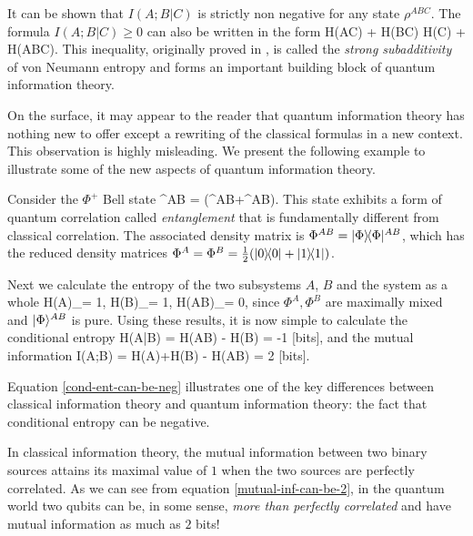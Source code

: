 \documentclass[aps,11pt,twoside,letterpaper]{article}
\theoremstyle{plain}
\theoremstyle{definition}
\begin{document}
			\noindent It can be shown that $I(A;B|C)$ is strictly non negative for any state $\rho^{ABC}$.
			The formula $I(A;B|C)\geq 0$ can also be written in the form
			\be	\label{strong-subadditivity}
				H(AC) + H(BC) 	\geq	H(C) + H(ABC).
			\ee
			This inequality, originally proved in \cite{LR73}, is called the \emph{strong subadditivity} of von Neumann 
			entropy and forms an important building block of quantum information theory.
			
			
			On the surface, it may appear to the reader that quantum information theory has nothing new to offer except 
			a rewriting of the classical formulas in a new context.
			This observation is highly misleading.
			We present the following example to illustrate some of the new aspects of quantum information theory.
			
			\begin{example}	\label{example:EPR-pair}
				Consider the $\Phi^{+}$\! Bell state 
				\be
					\ket{\Phi}^{AB} = (^{AB}+^{AB}).
				\ee
				This state exhibits a form of quantum correlation called \emph{entanglement} that is fundamentally
				different from classical correlation.
				The associated density matrix is $\Phi^{AB} = | \Phi \rangle\!\langle \Phi |^{AB}$, which has
				the reduced density matrices $\Phi^A = \Phi^B = \tfrac{1}{2}(| 0 \rangle\!\langle 0 | + | 1 \rangle\!\langle 1 |)$.
				
				Next we calculate the entropy of the two subsystems $A$, $B$ and the system as a whole 
				\be
					H(A)_\Phi = 1, 	\qquad
					H(B)_\Phi = 1, 	\qquad
					H(AB)_\Phi = 0,
				\ee
				since $\Phi^A,\Phi^B$ are maximally mixed and $| \Phi \rangle^{AB}$ is pure.
				Using these results, it is now simple to calculate the conditional entropy
				\be	\label{cond-ent-can-be-neg}
					H(A|B)	=	H(AB) - H(B)	= -1 \textup{ [bits]},
				\ee
				and the mutual information
				\be	\label{mutual-inf-can-be-2}
					I(A;B)	=	H(A)+H(B) - H(AB)	= 2 \textup{ [bits]}.
				\ee
			\end{example}
			
			Equation \eqref{cond-ent-can-be-neg} illustrates one of the key differences between classical information
			theory and quantum information theory: the fact that conditional entropy can be negative.
			
			In classical information theory, the mutual information between two binary sources attains its maximal value
			of $1$ when the two sources are perfectly correlated. As we can see from equation 
			\eqref{mutual-inf-can-be-2}, in the quantum world two qubits can be, in some sense,
			\emph{more than perfectly correlated} and have mutual information as much as $2$ bits!
			
\end{document}
